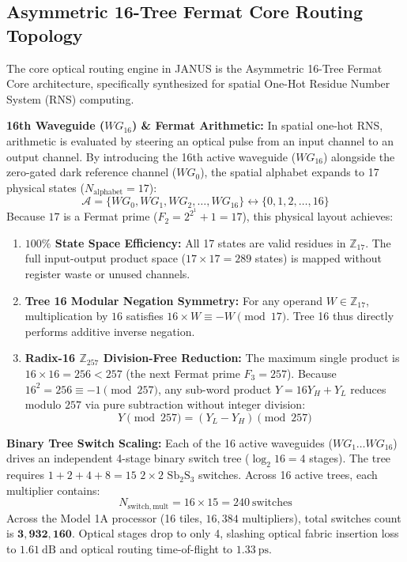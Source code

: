 \documentclass[journal]{IEEEtran}
\begin{document}
\subsection{Asymmetric 16-Tree Fermat Core Routing Topology}
The core optical routing engine in JANUS is the Asymmetric 16-Tree Fermat Core architecture, specifically synthesized for spatial One-Hot Residue Number System (RNS) computing.

\textbf{16th Waveguide ($WG_{16}$) \& Fermat Arithmetic:} In spatial one-hot RNS, arithmetic is evaluated by steering an optical pulse from an input channel to an output channel. By introducing the 16th active waveguide ($WG_{16}$) alongside the zero-gated dark reference channel ($WG_0$), the spatial alphabet expands to 17 physical states ($N_{\mathrm{alphabet}} = 17$):
\begin{equation}
    \mathcal{A} = \{ WG_0, WG_1, WG_2, \dots, WG_{16} \} \longleftrightarrow \{ 0, 1, 2, \dots, 16 \}
\end{equation}
Because $17$ is a Fermat prime ($F_2 = 2^{2^1} + 1 = 17$), this physical layout achieves:
\begin{enumerate}
    \item \textbf{$100\%$ State Space Efficiency:} All 17 states are valid residues in $\mathbb{Z}_{17}$. The full input-output product space ($17 \times 17 = 289$ states) is mapped without register waste or unused channels.
    \item \textbf{Tree 16 Modular Negation Symmetry:} For any operand $W \in \mathbb{Z}_{17}$, multiplication by $16$ satisfies $16 \times W \equiv -W \pmod{17}$. Tree 16 thus directly performs additive inverse negation.
    \item \textbf{Radix-16 $\mathbb{Z}_{257}$ Division-Free Reduction:} The maximum single product is $16 \times 16 = 256 < 257$ (the next Fermat prime $F_3 = 257$). Because $16^2 = 256 \equiv -1 \pmod{257}$, any sub-word product $Y = 16 Y_H + Y_L$ reduces modulo $257$ via pure subtraction without integer division:
    \begin{equation}
        Y \pmod{257} = (Y_L - Y_H) \pmod{257}
    \end{equation}
\end{enumerate}

\textbf{Binary Tree Switch Scaling:} Each of the 16 active waveguides ($WG_1 \dots WG_{16}$) drives an independent 4-stage binary switch tree ($\log_2 16 = 4$ stages). The tree requires $1 + 2 + 4 + 8 = 15$ $2 \times 2$ $\mathrm{Sb_2S_3}$ switches. Across 16 active trees, each multiplier contains:
\begin{equation}
    N_{\mathrm{switch,mult}} = 16 \times 15 = 240~\mathrm{switches}
\end{equation}
Across the Model 1A processor (16 tiles, $16,384$ multipliers), total switches count is $\mathbf{3,932,160}$. Optical stages drop to only 4, slashing optical fabric insertion loss to $1.61~\mathrm{dB}$ and optical routing time-of-flight to $1.33~\mathrm{ps}$.
\end{document}
